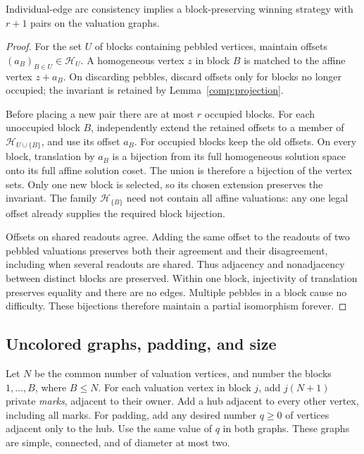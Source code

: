 \begin{lemma}\label{comp:sufficiency}
Individual-edge arc consistency implies a block-preserving winning
strategy with $r+1$ pairs on the valuation graphs.
\end{lemma}
\begin{proof}
For the set $U$ of blocks containing pebbled vertices, maintain offsets
$(a_B)_{B\in U}\in\mathcal H_U$.  A homogeneous vertex $z$ in block $B$
is matched to the affine vertex $z+a_B$.  On discarding pebbles, discard
offsets only for blocks no longer occupied; the invariant is retained
by Lemma~\ref{comp:projection}.

Before placing a new pair there are at most $r$ occupied blocks.
For each unoccupied block $B$, independently extend the retained offsets
to a member of $\mathcal H_{U\cup\{B\}}$, and use its offset $a_B$.
For occupied blocks keep the old offsets.  On every block, translation
by $a_B$ is a bijection from its full homogeneous solution space onto
its full affine solution coset.  The union is therefore a bijection of
the vertex sets.  Only one new block is selected, so its chosen extension
preserves the invariant.  The family $\mathcal H_{\{B\}}$ need not
contain all affine valuations: any one legal offset already supplies
the required block bijection.

Offsets on shared readouts agree.  Adding the same offset to the
readouts of two pebbled valuations preserves both their agreement and
their disagreement, including when several readouts are shared.  Thus
adjacency and nonadjacency between distinct blocks are preserved.
Within one block, injectivity of translation preserves equality and
there are no edges.  Multiple pebbles in a block cause no difficulty.
These bijections therefore maintain a partial isomorphism forever.
\end{proof}

\subsection{Uncolored graphs, padding, and size}

Let $N$ be the common number of valuation vertices, and number the
blocks $1,\ldots,B$, where $B\leq N$.  For each valuation vertex in
block $j$, add $j(N+1)$ private \emph{marks}, adjacent to their owner.
Add a hub adjacent to every other vertex, including all marks.  For
padding, add any desired number $q\geq0$ of vertices adjacent only to
the hub.  Use the same value of $q$ in both graphs.  These graphs are
simple, connected, and of diameter at most two.

